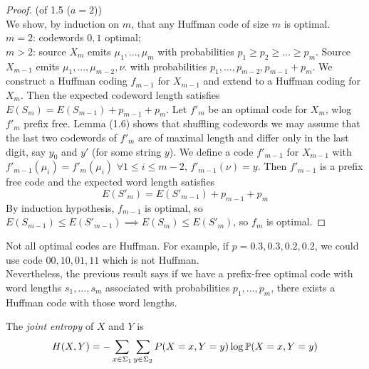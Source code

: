 \documentclass[a4paper]{article}
\begin{document}
\begin{proof} (of 1.5 ($a=2$))\\
We show, by induction on $m$, that any Huffman code of size $m$ is optimal.\\
$m=2$: codewords $0,1$ optimal;\\
$m>2$: source $X_m$ emits $\mu_1,...,\mu_m$ with probabilities $p_1 \geq p_2 \geq ... \geq p_m$. Source $X_{m-1}$ emits $\mu_1,...,\mu_{m-2},\nu$. with probabilities $p_1,...,p_{m-2},p_{m-1}+p_m$. We construct a Huffman coding $f_{m-1}$ for $X_{m-1}$ and extend to a Huffman coding for $X_m$. Then the expected codeword length satisfies $E(S_m) = E(S_{m-1}) + p_{m-1} + p_m$. Let $f'_m$ be an optimal code for $X_m$, wlog $f'_m$ prefix free. Lemma (1.6) shows that shuffling codewords we may assume that the last two codewords of $f'_m$ are of maximal length and differ only in the last digit, say $y_0$ and $y'$ (for some string $y$). We define a code $f'_{m-1}$ for $X_{m-1}$ with $f'_{m-1}(\mu_i) = f'_m (\mu_i)$ $\forall 1 \leq i \leq m-2$, $f'_{m-1} (\nu) =y$. Then $f'_{m-1}$ is a prefix free code and the expected word length satisfies $$E(S'_m) = E(S'_{m-1}) + p_{m-1}+p_m$$
By induction hypothesis, $f_{m-1}$ is optimal, so $E(S_{m-1}) \leq E(S'_{m-1}) \implies E(S_m) \leq E(S'_m)$, so $f_m$ is optimal.
\end{proof}

\begin{rem}
Not all optimal codes are Huffman. For example, if $p=0.3,0.3,0.2,0.2$, we could use code $00,10,01,11$ which is not Huffman.\\
Nevertheless, the previous result says if we have a prefix-free optimal code with word lengths $s_1,...,s_m$ associated with probabilities $p_1,...,p_m$, there exists a Huffman code with those word lengths.
\end{rem}

\begin{defi}
The \emph{joint entropy} of $X$ and $Y$ is
\begin{equation*}
\begin{aligned}
H(X,Y) = -\sum_{x \in \Sigma_1} \sum_{y \in \Sigma_2} P(X=x,Y=y) \log \P(X=x,Y=y)
\end{aligned}
\end{equation*}
\end{defi}
\end{document}
